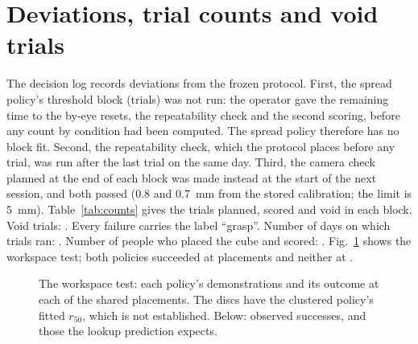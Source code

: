 \section{Deviations, trial counts and void trials}
\label{app:counts}
The decision log records \nDeviations deviations from the frozen protocol. %
First, the spread policy's threshold block (\plannedSpread trials) was not run: the operator gave the remaining time to the by-eye resets, the repeatability check and the second scoring, before any count by condition had been computed. The spread policy therefore has no block fit. %
Second, the repeatability check, which the protocol places before any trial, was run after the last trial on the same day.
Third, the camera check planned at the end of each block was made instead at the start of the next session, and both passed (0.8 and 0.7~mm from the stored calibration; the limit is 5~mm). %
Table~\ref{tab:counts} gives the trials planned, scored and void in each block.
Void trials: \voidReasons.
Every failure carries the label ``grasp''. %
Number of days on which trials ran: \nTrialDays. Number of people who placed the cube and scored: \nOperators.
Fig.~\ref{fig:workspace} shows the workspace test; both policies succeeded at \pairsBoth placements and neither at \pairsNeither.

\begin{figure}[t]
\centering
{}
\caption{The workspace test: each policy's demonstrations and its outcome at each of the \nPairs shared placements. The discs have the clustered policy's fitted $r_{50}$, which is not established. Below: observed successes, and those the lookup prediction expects.}
\label{fig:workspace}
\end{figure}

